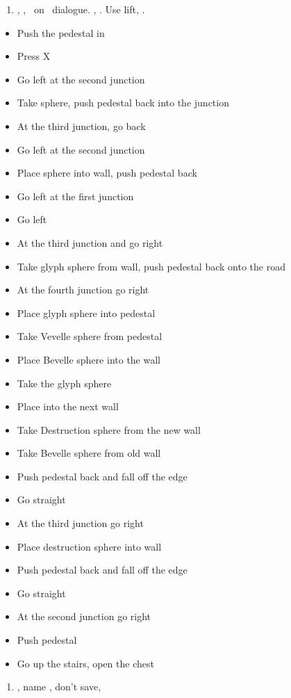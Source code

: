 \begin{enumerate}[resume]
	\item \sd, \fmv[1:30], \sd\ on \yuna\ dialogue. \skippablefmv[30], \sd. Use lift, \sd.
\end{enumerate}
\vfill
\begin{trial}
\begin{itemize}
	\item Push the pedestal in
	\item Press X
	\item Go left at the second junction
	\item Take sphere, push pedestal back into the junction
	\item At the third junction, go back
	\item Go left at the second junction
	\item Place sphere into wall, push pedestal back
	\item Go left at the first junction
	\item Go left
	\item At the third junction and go right
	\item Take glyph sphere from wall, push pedestal back onto the road
	\item At the fourth junction go right
	\item Place glyph sphere into pedestal
	\item Take Vevelle sphere from pedestal
	\item Place Bevelle sphere into the wall
	\item Take the glyph sphere
	\item Place into the next wall
	\item Take Destruction sphere from the new wall %
	\item Take Bevelle sphere from old wall
	\item Push pedestal back and fall off the edge
	\item Go straight
	\item At the third junction go right
	\item Place destruction sphere into wall
	\item Push pedestal back and fall off the edge
	\item Go straight
	\item At the second junction go right
	\item Push pedestal
	\item Go up the stairs, open the chest
\end{itemize}
\end{trial}
\begin{enumerate}[resume]
	\item \sd, name \bahamut, don't save, \sd
\end{enumerate}
